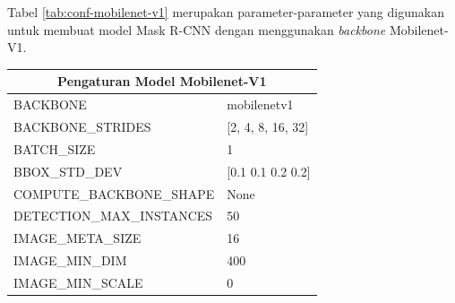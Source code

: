 Tabel \ref{tab:conf-mobilenet-v1} merupakan parameter-parameter yang digunakan untuk membuat model Mask R-CNN dengan menggunakan \textit{backbone} Mobilenet-V1.

\begin{longtable}[h]{|l|l|}
	\hline
	\multicolumn{2}{|c|}{\textbf{Pengaturan Model Mobilenet-V1}}                                                                                                                                                                         \\ \hline
	BACKBONE                        & mobilenetv1                                                                                                                                                                              \\ \hline
	BACKBONE\_STRIDES               & {[}2, 4, 8, 16, 32{]}                                                                                                                                                                 \\ \hline
	BATCH\_SIZE                     & 1                                                                                                                                                                                      \\ \hline
	BBOX\_STD\_DEV                  & {[}0.1 0.1 0.2 0.2{]}                                                                                                                                                                  \\ \hline
	COMPUTE\_BACKBONE\_SHAPE        & None                                                                                                                                                                                   \\ \hline
	DETECTION\_MAX\_INSTANCES       &	 50                                                    	\\ \hline
	IMAGE\_META\_SIZE               & 16                                                                                                                                                                                     \\ \hline
	IMAGE\_MIN\_DIM                 & 400                                                                                                                                                                                    \\ \hline
	IMAGE\_MIN\_SCALE               & 0                                                                                                                                                                                      \\ \hline

\end{longtable}

